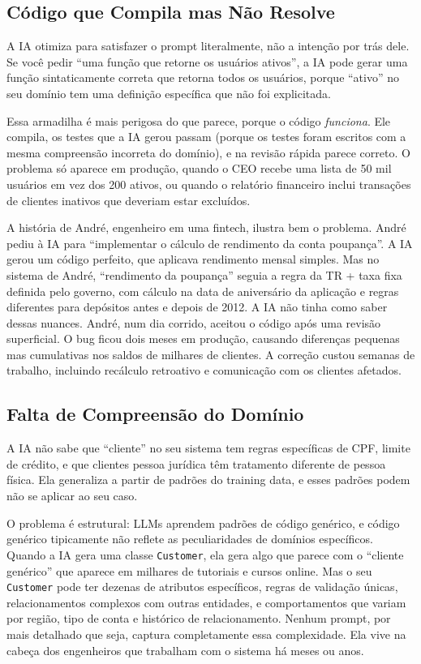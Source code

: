 \subsection{Código que Compila mas Não Resolve}

A IA otimiza para satisfazer o prompt literalmente, não a intenção por
trás dele. Se você pedir ``uma função que retorne os usuários ativos'', a
IA pode gerar uma função sintaticamente correta que retorna todos os
usuários, porque ``ativo'' no seu domínio tem uma definição específica
que não foi explicitada.

Essa armadilha é mais perigosa do que parece, porque o código \textit{funciona}. Ele
compila, os testes que a IA gerou passam (porque os testes foram escritos com a mesma
compreensão incorreta do domínio), e na revisão rápida parece correto. O problema só
aparece em produção, quando o CEO recebe uma lista de 50 mil usuários em vez dos 200
ativos, ou quando o relatório financeiro inclui transações de clientes inativos que
deveriam estar excluídos.

A história de André, engenheiro em uma fintech, ilustra bem o problema. André pediu à
IA para ``implementar o cálculo de rendimento da conta poupança''. A IA gerou um
código perfeito, que aplicava rendimento mensal simples. Mas no sistema de André,
``rendimento da poupança'' seguia a regra da TR + taxa fixa definida pelo governo, com
cálculo na data de aniversário da aplicação e regras diferentes para depósitos antes
e depois de 2012. A IA não tinha como saber dessas nuances. André, num dia corrido,
aceitou o código após uma revisão superficial. O bug ficou dois meses em produção,
causando diferenças pequenas mas cumulativas nos saldos de milhares de clientes. A
correção custou semanas de trabalho, incluindo recálculo retroativo e comunicação com
os clientes afetados.

\subsection{Falta de Compreensão do Domínio}

A IA não sabe que ``cliente'' no seu sistema tem regras específicas de CPF,
limite de crédito, e que clientes pessoa jurídica têm tratamento diferente
de pessoa física. Ela generaliza a partir de padrões do training data, e
esses padrões podem não se aplicar ao seu caso.

O problema é estrutural: LLMs aprendem padrões de código genérico, e código genérico
tipicamente não reflete as peculiaridades de domínios específicos. Quando a IA gera
uma classe \texttt{Customer}, ela gera algo que parece com o ``cliente genérico'' que
aparece em milhares de tutoriais e cursos online. Mas o seu \texttt{Customer} pode ter
dezenas de atributos específicos, regras de validação únicas, relacionamentos complexos
com outras entidades, e comportamentos que variam por região, tipo de conta e histórico
de relacionamento. Nenhum prompt, por mais detalhado que seja, captura completamente
essa complexidade. Ela vive na cabeça dos engenheiros que trabalham com o sistema há
meses ou anos.

